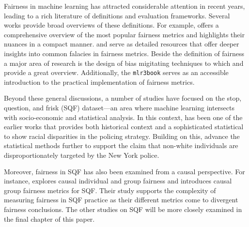 Fairness in machine learning has attracted considerable attention in recent years, leading to a rich literature of definitions and evaluation frameworks. Several works provide broad overviews of these definitions. For example, \cite{verma2018} offers a comprehensive overview of the most popular fairness metrics and \cite{castelnovo2022} highlights their nuances in a compact manner. \cite{corbett-davies} and \cite{barocas} serve as detailed resources that offer deeper insights into common falacies in fairness metrics. Beside the definition of fairness a major area of research is the design of bias migitating techniques to which \cite{mehrabi2022} and \cite{caton2024} provide a great overview. Additionally, the \texttt{mlr3book} serves as an accessible introduction to the practical implementation of fairness metrics.

Beyond these general discussions, a number of studies have focused on the stop, question, and frisk (SQF) dataset—an area where machine learning intersects with socio-economic and statistical analysis. In this context, \cite{gelman2007} has been one of the earlier works that provides both historical context and a sophisticated statistical to show racial disparities in the policing strategy. Building on this, \cite{goel2016} advance the statistical methods further to support the claim that non-white individuals are disproportionately targeted by the New York police.

Moreover, fairness in SQF has also been examined from a causal perspective. For instance, \cite{Khademi2019FADMELC} explores causal individual and group fairness and introduces causal group fairness metrics for SQF. Their study supports the complexity of measuring fairness in SQF practice as their different metrics come to divergent fairness conclusions. The other studies on SQF \cite{Badr2022DTFANSP, RambachanBBOEFW, kallus2018} will be more closely examined in the final chapter of this paper.


